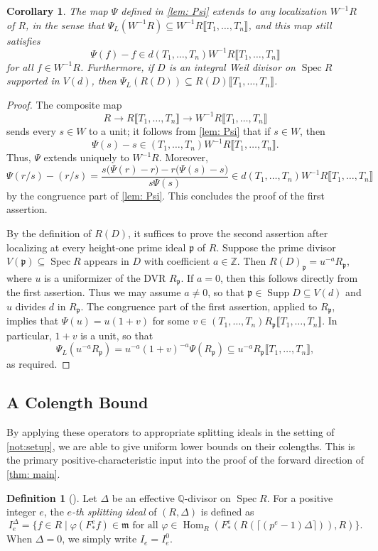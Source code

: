 \documentclass[11pt,leqno]{amsart}
\numberwithin{equation}{section}
\newtheorem{corollary}[theorem]{Corollary}
\theoremstyle{definition}
\newtheorem{definition}[theorem]{Definition}
\theoremstyle{remark}
\newcommand{\Q}{\mathbb{Q}}
\newcommand{\Z}{\mathbb{Z}}
\newcommand{\Spec}{\operatorname{Spec}}
\newcommand{\llb}{\llbracket}
\newcommand{\rrb}{\rrbracket}
\newcommand{\Supp}{\operatorname{Supp}}
\begin{document}
\begin{corollary} \label{cor: PsiLocalization}
The map $\Psi$ defined in \cref{lem: Psi} extends to any localization $W^{-1}R$ of $R$, in the sense that $\Psi_L(W^{-1}R) \subseteq W^{-1}R\llb T_1, \dots, T_n \rrb$, and this map still satisfies $$\Psi(f) - f \in d(T_1, \dots, T_n)W^{-1}R\llb T_1, \dots, T_n \rrb$$ for all $f \in W^{-1}R$. Furthermore, if $D$ is an integral Weil divisor on $\Spec R$ supported in $V(d)$, then $\Psi_L(R(D)) \subseteq R(D)\llb T_1, \dots, T_n \rrb$.
\end{corollary}

\begin{proof}
The composite map $$R \longrightarrow R\llb T_1, \dots, T_n \rrb \longrightarrow W^{-1}R\llb T_1, \dots, T_n \rrb$$ sends every $s \in W$ to a unit; it follows from \cref{lem: Psi} that if $s \in W$, then $$\Psi(s) - s \in (T_1, \dots, T_n)W^{-1}R\llb T_1, \dots, T_n \rrb.$$ Thus, $\Psi$ extends uniquely to $W^{-1}R$. Moreover, $$\Psi(r/s) - (r/s) = \frac{s\big(\Psi(r) - r\big) - r\big(\Psi(s) - s\big)}{s\Psi(s)} \in d(T_1, \dots, T_n)W^{-1}R\llb T_1, \dots, T_n \rrb$$ by the congruence part of \cref{lem: Psi}. This concludes the proof of the first assertion.

By the definition of $R(D)$, it suffices to prove the second assertion after localizing at every height-one prime ideal $\mathfrak{p}$ of $R$. Suppose the prime divisor $V(\mathfrak{p}) \subseteq \Spec R$ appears in $D$ with coefficient $a \in \Z$. Then $R(D)_\mathfrak{p} = u^{-a} R_\mathfrak{p}$, where $u$ is a uniformizer of the DVR $R_\mathfrak{p}$. If $a = 0$, then this follows directly from the first assertion. Thus we may assume $a \neq 0$, so that $\mathfrak{p} \in \Supp D \subseteq V(d)$ and $u$ divides $d$ in $R_{\mathfrak{p}}$. The congruence part of the first assertion, applied to $R_{\mathfrak{p}}$, implies that $\Psi(u) = u(1 + v)$ for some $v \in (T_1, \dots, T_n)R_{\mathfrak{p}}\llb T_1, \dots, T_n \rrb$. In particular, $1 + v$ is a unit, so that $$\Psi_L(u^{-a} R_{\mathfrak{p}}) = u^{-a}(1 + v)^{-a}\Psi(R_{\mathfrak{p}}) \subseteq u^{-a} R_{\mathfrak{p}}\llb T_1, \dots, T_n \rrb,$$ as required.
\end{proof}




\subsection*{A Colength Bound} By applying these operators to appropriate splitting ideals in the setting of \cref{not:setup}, we are able to give uniform lower bounds on their colengths. This is the primary positive-characteristic input into the proof of the forward direction of \cref{thm: main}. 
\begin{definition}[{\cite[Definition 3.3]{bst12}}]
Let $\Delta$ be an effective $\Q$-divisor on $\Spec R$. For a positive integer $e$, the \textit{$e$-th splitting ideal} of $(R, \Delta)$ is defined as $$I^\Delta_e = \{ f \in R \;|\; \varphi(F^e_* f) \in \mathfrak{m} \text{ for all } \varphi \in \operatorname{Hom}_R(F^e_*(R(\lceil (p^e - 1)\Delta \rceil)), R) \}.$$ When $\Delta = 0$, we simply write $I_e = I^0_e$.
\end{definition}
\end{document}
